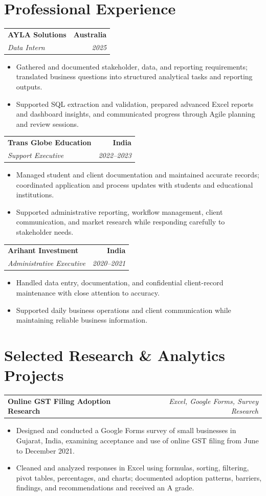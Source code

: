 \documentclass[letterpaper,10pt]{article}
\makeatletter
\newcommand{\role}[4]{%
  \begin{tabularx}{\textwidth}{@{}Xr@{}}
    \textbf{#1} & \textbf{#2} \\
    \textit{#3} & \textit{#4}
  \end{tabularx}\vspace{-1pt}
}
\newcommand{\project}[2]{%
  \begin{tabularx}{\textwidth}{@{}Xr@{}}
    \textbf{#1} & \textit{#2}
  \end{tabularx}\vspace{-1pt}
}
\makeatother
\begin{document}
\section{Professional Experience}
\role{AYLA Solutions}{Australia}{Data Intern}{2025}
\begin{itemize}
  \item Gathered and documented stakeholder, data, and reporting requirements; translated business questions into structured analytical tasks and reporting outputs.
  \item Supported SQL extraction and validation, prepared advanced Excel reports and dashboard insights, and communicated progress through Agile planning and review sessions.
\end{itemize}
\vspace{1pt}

\role{Trans Globe Education}{India}{Support Executive}{2022--2023}
\begin{itemize}
  \item Managed student and client documentation and maintained accurate records; coordinated application and process updates with students and educational institutions.
  \item Supported administrative reporting, workflow management, client communication, and market research while responding carefully to stakeholder needs.
\end{itemize}
\vspace{1pt}

\role{Arihant Investment}{India}{Administrative Executive}{2020--2021}
\begin{itemize}
  \item Handled data entry, documentation, and confidential client-record maintenance with close attention to accuracy.
  \item Supported daily business operations and client communication while maintaining reliable business information.
\end{itemize}

\section{Selected Research \& Analytics Projects}
\project{Online GST Filing Adoption Research}{Excel, Google Forms, Survey Research}
\begin{itemize}
  \item Designed and conducted a Google Forms survey of small businesses in Gujarat, India, examining acceptance and use of online GST filing from June to December 2021.
  \item Cleaned and analyzed responses in Excel using formulas, sorting, filtering, pivot tables, percentages, and charts; documented adoption patterns, barriers, findings, and recommendations and received an A grade.
\end{itemize}
\vspace{1pt}
\end{document}

